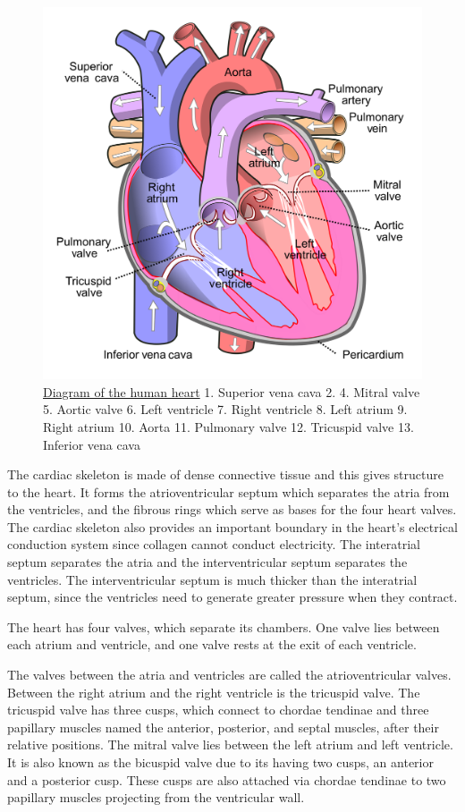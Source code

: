 \begin{figure}

{\centering \includegraphics[width=0.7\linewidth]{./figures/circulation/Diagram_of_the_human_heart_(cropped)} 

}

\caption{\href{https://commons.wikimedia.org/wiki/File:Diagram_of_the_human_heart_(cropped).svg}{Diagram of the human heart} 1. Superior vena cava 2. 4. Mitral valve 5. Aortic valve 6. Left ventricle 7. Right ventricle 8. Left atrium 9. Right atrium 10. Aorta 11. Pulmonary valve 12. Tricuspid valve 13. Inferior vena cava}\label{fig:heartdiagram}
\end{figure}

The cardiac skeleton is made of dense connective tissue and this gives structure to the heart. It forms the atrioventricular septum which separates the atria from the ventricles, and the fibrous rings which serve as bases for the four heart valves. The cardiac skeleton also provides an important boundary in the heart's electrical conduction system since collagen cannot conduct electricity. The interatrial septum separates the atria and the interventricular septum separates the ventricles. The interventricular septum is much thicker than the interatrial septum, since the ventricles need to generate greater pressure when they contract.

The heart has four valves, which separate its chambers. One valve lies between each atrium and ventricle, and one valve rests at the exit of each ventricle.

The valves between the atria and ventricles are called the atrioventricular valves. Between the right atrium and the right ventricle is the tricuspid valve. The tricuspid valve has three cusps, which connect to chordae tendinae and three papillary muscles named the anterior, posterior, and septal muscles, after their relative positions. The mitral valve lies between the left atrium and left ventricle. It is also known as the bicuspid valve due to its having two cusps, an anterior and a posterior cusp. These cusps are also attached via chordae tendinae to two papillary muscles projecting from the ventricular wall.

